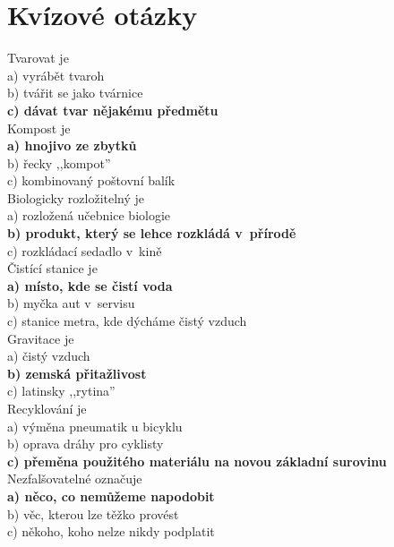 
\section{Kvízové otázky}
\begin{multicols}{\value{columnsthindata}}

\noindent
Tvarovat je\\
a) vyrábět tvaroh\\
b) tvářit se jako tvárnice\\
\textbf{c) dávat tvar nějakému předmětu}\\

\noindent
Kompost je\\
\textbf{a) hnojivo ze zbytků}\\
b) řecky ,,kompot''\\
c) kombinovaný poštovní balík\\

\noindent
Biologicky rozložitelný je\\
a) rozložená učebnice biologie\\
\textbf{b) produkt, který se lehce rozkládá v~přírodě}\\
c) rozkládací sedadlo v~kině\\

\noindent
Čistící stanice je\\
\textbf{a) místo, kde se čistí voda}\\
b) myčka aut v~servisu\\
c) stanice metra, kde dýcháme čistý vzduch\\

\noindent
Gravitace je\\
a) čistý vzduch\\
\textbf{b) zemská přitažlivost}\\
c) latinsky ,,rytina''\\

\noindent
Recyklování je\\
a) výměna pneumatik u bicyklu\\
b) oprava dráhy pro cyklisty\\
\textbf{c) přeměna použitého materiálu na novou základní surovinu}\\

\noindent
Nezfalšovatelné označuje\\
\textbf{a) něco, co nemůžeme napodobit}\\
b) věc, kterou lze těžko provést\\
c) někoho, koho nelze nikdy podplatit\\


\end{multicols}
